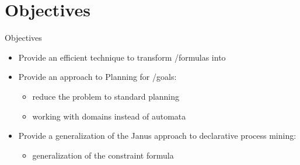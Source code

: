 \documentclass{beamer}
\begin{document}
\section{Objectives}
\begin{frame}{Objectives}
\begin{itemize}
	\item Provide an efficient technique to transform \LTLf/\PLTL formulas into \DFAs		
	\vskip 0.5cm
	\item Provide an approach to \FOND Planning for \LTLf/\PLTL goals:
		\begin{itemize}
			\item 	reduce the problem to standard \FOND planning
			\item 	working with \FOND domains instead of automata
		\end{itemize}
	
	\vskip 0.5cm
	\item Provide a generalization of the Janus approach to declarative process mining:
			\begin{itemize}
				\item 	generalization of the constraint formula
			\end{itemize}	

\end{itemize}
\end{frame}
\end{document}
